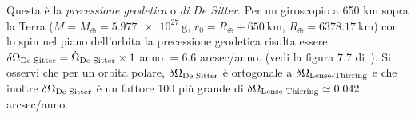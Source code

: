 Questa è la \emph{precessione geodetica} o \emph{di De Sitter}.  Per un
giroscopio a 650 km sopra la Terra ($M=M_{\oplus} = \SI{5.977e27}{\gram}$,
$r_0=R_{\oplus}+\SI{650}{\kilo\metre}$, $R_{\oplus}=\SI{6378.17}{\kilo\metre}$)
con lo spin nel piano dell'orbita la precessione geodetica risulta essere
$\delta \Omega_{\textup{De Sitter}} = {\dot{\Omega}_{\textup{De Sitter}}} \times
1$ anno $= 6.6$ arcsec/anno.  (vedi la figura 7.7
di~\textcite[355]{ohanian:gravitazione}).  Si osservi che per un orbita polare,
$\delta \Omega_{\textup{De Sitter}}$ è ortogonale a $\delta
\Omega_{\textup{Lense-Thirring}}$ e che inoltre $\delta \Omega_{\textup{De
    Sitter}}$ è un fattore 100 più grande di $\delta
\Omega_{\textup{Lense-Thirring}} \simeq 0.042$ arcsec/anno.

